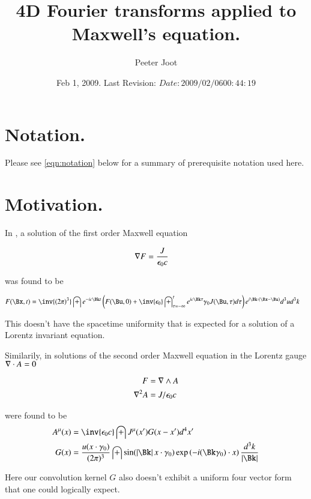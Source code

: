 \documentclass{article}
\title{ 4D Fourier transforms applied to Maxwell's equation. }
\author{Peeter Joot}
\date{ Feb 1, 2009.  Last Revision: $Date: 2009/02/06 00:44:19 $ }
\begin{document}
\maketitle{}
\tableofcontents

\section{ Notation. }

Please see \ref{eqn:notation} below for a summary of prerequisite notation used here.

\section{ Motivation. }

In \cite{PJfirstOrderMaxwell}, a solution of the first order Maxwell equation

\begin{align}
\nabla F &= \frac{J }{\epsilon_0 c}
\end{align}

was found to be

\begin{align}
F(\Bx,t) 
&=
\inv{({2\pi})^3} \int 
e^{-i c \Bk t}
\left(
F(\Bu, 0) + \inv{\epsilon_0} \int_{\tau = -\infty}^{t} e^{i c \Bk \tau } \gamma_0 J(\Bu,\tau)  d\tau  
\right)
e^{i \Bk \cdot (\Bx-\Bu)} 
d^3 u
d^3 k
\end{align}

This doesn't have the spacetime uniformity that is expected for a solution of a Lorentz invariant equation.

Similarily, in \cite{PJfourierMaxwellSecondOrder} solutions of the second order Maxwell equation in the Lorentz gauge
$\nabla \cdot A = 0$ 

\begin{align*}
F &= \nabla \wedge A \\
\nabla^2 A &= J/\epsilon_0 c
\end{align*}

were found to be
\begin{align}\label{eqn:fourVectorPotentials}
{A^\mu}(x)
&= \inv{\epsilon_0 c} \int J^\mu(x') G(x - x') d^4 x' \\
G(x)
&= 
\frac{u(x \cdot \gamma_0)}{ (2\pi)^3 }
\int
\sin( \Abs{\Bk} x \cdot \gamma_0 )
\exp\left( -i (\Bk \gamma_0) \cdot x \right)
\frac{d^3 k}{ \Abs{\Bk} }
\end{align}

Here our convolution kernel $G$ also doesn't exhibit a uniform four vector form that one could logically expect.
\end{document}
